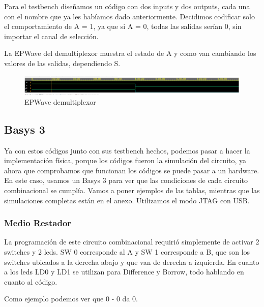 \documentclass[12pt]{article}  %
\begin{document}


Para el testbench diseñamos un código con dos inputs y dos outputs, cada una con el nombre que ya les habíamos dado anteriormente. Decidimos codificar solo el comportamiento de A = 1, ya que si A = 0, todas las salidas serían 0, sin importar el canal de selección.



La EPWave del demultiplexor muestra el estado de A y como van cambiando los valores de las salidas, dependiendo S.

\begin{figure}[!ht]
    \centering
    \caption{EPWave demultiplexor}
    \includegraphics[width=1.1\linewidth]{Imagenes/waves/demux-ep.png}
\end{figure}

\subsection*{Basys 3}
Ya con estos códigos junto con sus testbench hechos, podemos pasar a hacer la implementación física, porque los códigos fueron la simulación del circuito, ya ahora que comprobamos que funcionan los códigos se puede pasar a un hardware. En este caso, usamos un Basys 3 para ver que las condiciones de cada circuito combinacional se cumplía. Vamos a poner ejemplos de las tablas, mientras que las simulaciones completas están en el anexo. Utilizamos el modo JTAG con USB.

\subsubsection*{Medio Restador}
La programación de este circuito combinacional requirió simplemente de activar 2 switches y 2 leds. SW 0 corresponde al A y SW 1 corresponde a B, que son los switches ubicados a la derecha abajo y que van de derecha a izquierda. En cuanto a los leds LD0 y LD1 se utilizan para Difference y Borrow, todo hablando en cuanto al código.

Como ejemplo podemos ver que 0 - 0 da 0.
\end{document}
